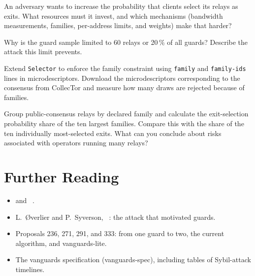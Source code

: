 \begin{esercizio}[2]\label{es:13-sybil}
An adversary wants to increase the probability that clients select its relays as exits. What resources must it invest, and which mechanisms (bandwidth measurements, families, per-address limits, and weights) make that harder?
\end{esercizio}

\begin{esercizio}[2]\label{es:13-campione}
Why is the guard sample limited to 60 relays or 20\,\% of all guards? Describe the attack this limit prevents.
\end{esercizio}

\begin{esercizio}[3]\label{es:13-famiglie}
Extend \texttt{Selector} to enforce the family constraint using \texttt{family} and \texttt{family-ids} lines in microdescriptors. Download the microdescriptors corresponding to the consensus from CollecTor and measure how many draws are rejected because of families.
\end{esercizio}

\begin{esercizio}[3]\label{es:13-operatori}
Group public-consensus relays by declared family and calculate the exit-selection probability share of the ten largest families. Compare this with the share of the ten individually most-selected exits. What can you conclude about risks associated with operators running many relays?
\end{esercizio}

\section*{Further Reading}
\begin{itemize}
  \item {} and ~\cite{torspec}.
  \item L.~Øverlier and P.~Syverson, ~\cite{overlier2006locating}: the attack that motivated guards.
  \item Proposals 236, 271, 291, and 333: from one guard to two, the current algorithm, and vanguards-lite.
  \item The vanguards specification (vanguards-spec), including tables of Sybil-attack timelines.
\end{itemize}
